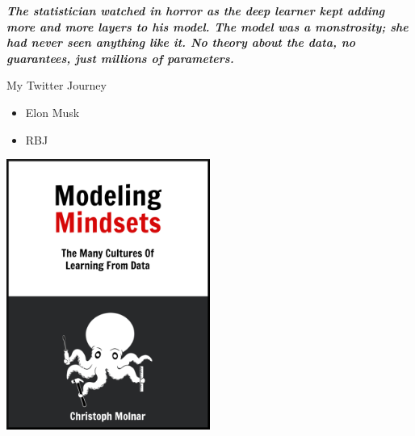 \documentclass[aspectratio=169]{beamer}
\author{\authorlabel}
\newcommand{\mysubtitle}{\color{Pink}\Large{\textbf{\textit{The statistician watched in horror as the deep learner kept adding more and more layers to his model. The model was a monstrosity; she had never seen anything like it. No theory about the data, no guarantees, just millions of parameters.}}}}
\begin{document}


\begin{frame}
	\centering
	\mysubtitle
\end{frame}

\begin{frame}{My Twitter Journey}
\begin{minipage}{0.5\textwidth}
  \begin{itemize}
    \item Elon Musk
    \item RBJ 
  \end{itemize}
\end{minipage}%
\begin{minipage}{0.5\textwidth}
  \centering
  \includegraphics[width=0.5\textwidth]{figures/cover.png}
\end{minipage}
\end{frame}
\end{document}
